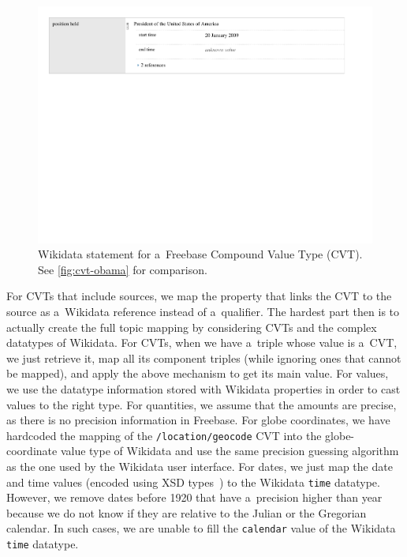 \documentclass{sig-alternate-2013}
\begin{document}
\begin{figure}[!htbp]
  \centering
  \includegraphics[width=1\columnwidth]{img/wikidata-statement-obama.pdf}
  \caption{Wikidata statement for a~Freebase Compound Value Type (CVT).
    See \autoref{fig:cvt-obama} for comparison.}
  \label{fig:statement-obama}
\end{figure}

For CVTs that include sources, we map the property that links the CVT
to the source as a~Wikidata reference instead of a~qualifier.
The hardest part then is to actually create the full topic mapping
by considering CVTs and the complex datatypes of Wikidata.
For CVTs, when we have a~triple whose value is a~CVT, we just retrieve it,
map all its component triples (while ignoring ones that cannot be mapped),
and apply the above mechanism to get its main value.
For values, we use the datatype information stored with Wikidata properties
in order to cast values to the right type.
For quantities, we assume that the amounts are precise,
as there is no precision information in Freebase.
For globe coordinates, we have hardcoded the mapping of the \texttt{/location/geocode} CVT
into the globe-coordinate value type of Wikidata
and use the same precision guessing algorithm as the one used by the Wikidata user interface.
For dates, we just map the date and time values
(encoded using XSD types~\cite{campbell2003xmlschema})
to the Wikidata \texttt{time} datatype. However, we remove dates before 1920 that have
a~precision higher than year because we do not know
if they are relative to the Julian or the Gregorian calendar.
In such cases, we are unable to fill the \texttt{calendar} value of the Wikidata \texttt{time} datatype.
\end{document}

